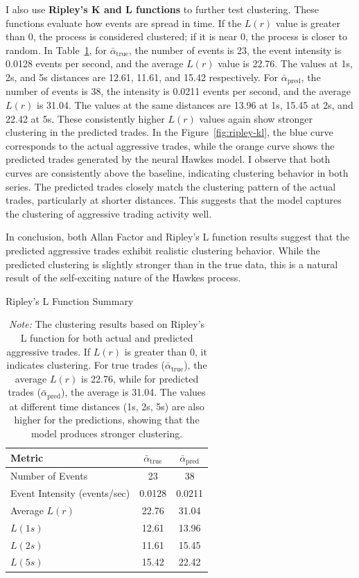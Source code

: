I also use \textbf{Ripley's K and L functions} to further test clustering. These functions evaluate how events are spread in time. If the \( L(r) \) value is greater than 0, the process is considered clustered; if it is near 0, the process is closer to random. In Table~\ref{tb:ripley-l}, for $\bar{\alpha}_\text{true}$, the number of events is 23, the event intensity is 0.0128 events per second, and the average \( L(r) \) value is 22.76. The values at 1s, 2s, and 5s distances are 12.61, 11.61, and 15.42 respectively. For $\bar{\alpha}_\text{pred}$, the number of events is 38, the intensity is 0.0211 events per second, and the average \( L(r) \) is 31.04. The values at the same distances are 13.96 at 1s, 15.45 at 2s, and 22.42 at 5s. These consistently higher \( L(r) \) values again show stronger clustering in the predicted trades. In the Figure~\ref{fig:ripley-kl}, the blue curve corresponds to the actual aggressive trades, while the orange curve shows the predicted trades generated by the neural Hawkes model. I observe that both curves are consistently above the baseline, indicating clustering behavior in both series. The predicted trades closely match the clustering pattern of the actual trades, particularly at shorter distances. This suggests that the model captures the clustering of aggressive trading activity well.

In conclusion, both Allan Factor and Ripley's L function results suggest that the predicted aggressive trades exhibit realistic clustering behavior. While the predicted clustering is slightly stronger than in the true data, this is a natural result of the self-exciting nature of the Hawkes process.

\begin{table}[H]
    \centering
    \caption{Ripley's L Function Summary}
    \caption*{\textit{Note:} The clustering results based on Ripley's L function for both actual and predicted aggressive trades. If \( L(r) \) is greater than 0, it indicates clustering. For true trades ($\bar{\alpha}_\text{true}$), the average \( L(r) \) is 22.76, while for predicted trades ($\bar{\alpha}_\text{pred}$), the average is 31.04. The values at different time distances (1s, 2s, 5s) are also higher for the predictions, showing that the model produces stronger clustering.}
    \label{tb:ripley-l}
    \begin{tabular}{lcc}
    \toprule
    \textbf{Metric} & $\bar{\alpha}_\text{true}$ & $\bar{\alpha}_\text{pred}$ \\
    \midrule
    Number of Events & 23 & 38 \\
    Event Intensity (events/sec) & 0.0128 & 0.0211 \\
    Average \( L(r) \) & 22.76 & 31.04 \\
    \( L(1s) \) & 12.61 & 13.96 \\
    \( L(2s) \) & 11.61 & 15.45 \\
    \( L(5s) \) & 15.42 & 22.42 \\
    \bottomrule
    \end{tabular}
\end{table}

